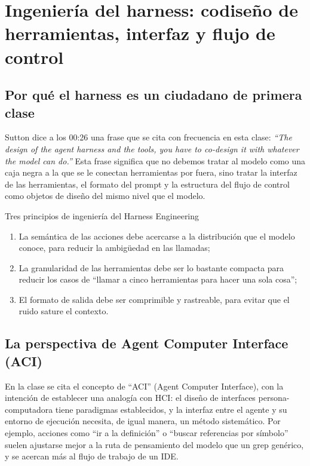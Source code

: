 \section{Ingeniería del harness: codiseño de herramientas, interfaz y flujo de control}

\subsection{Por qué el harness es un ciudadano de primera clase}
Sutton dice a los 00:26 una frase que se cita con frecuencia en esta clase: \textit{``The design of the agent harness and the tools, you have to co-design it with whatever the model can do.''}
Esta frase significa que no debemos tratar al modelo como una caja negra a la que se le conectan herramientas por fuera, sino tratar la interfaz de las herramientas, el formato del prompt y la estructura del flujo de control como objetos de diseño del mismo nivel que el modelo.

\begin{importantbox}{Tres principios de ingeniería del Harness Engineering}
\begin{enumerate}
    \item La semántica de las acciones debe acercarse a la distribución que el modelo conoce, para reducir la ambigüedad en las llamadas;
    \item La granularidad de las herramientas debe ser lo bastante compacta para reducir los casos de ``llamar a cinco herramientas para hacer una sola cosa'';
    \item El formato de salida debe ser comprimible y rastreable, para evitar que el ruido sature el contexto.
\end{enumerate}
\end{importantbox}

\subsection{La perspectiva de Agent Computer Interface (ACI)}
En la clase se cita el concepto de ``ACI'' (Agent Computer Interface), con la intención de establecer una analogía con HCI: el diseño de interfaces persona-computadora tiene paradigmas establecidos, y la interfaz entre el agente y su entorno de ejecución necesita, de igual manera, un método sistemático. Por ejemplo, acciones como ``ir a la definición'' o ``buscar referencias por símbolo'' suelen ajustarse mejor a la ruta de pensamiento del modelo que un grep genérico, y se acercan más al flujo de trabajo de un IDE.

